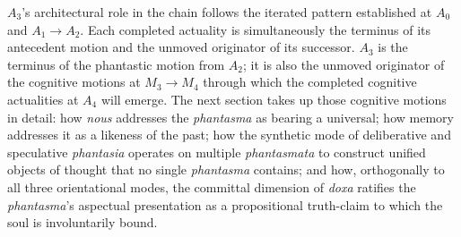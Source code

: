\documentclass[12pt]{article}
\begin{document}
$A_3$'s architectural role in the chain follows the iterated pattern established at $A_0$ and $A_1$$\to$$A_2$. Each completed actuality is simultaneously the terminus of its antecedent motion and the unmoved originator of its successor. $A_3$ is the terminus of the phantastic motion from $A_2$; it is also the unmoved originator of the cognitive motions at $M_3$$\to$$M_4$ through which the completed cognitive actualities at $A_4$ will emerge. The next section takes up those cognitive motions in detail: how \textit{nous} addresses the \textit{phantasma} as bearing a universal; how memory addresses it as a likeness of the past; how the synthetic mode of deliberative and speculative \textit{phantasia} operates on multiple \textit{phantasmata} to construct unified objects of thought that no single \textit{phantasma} contains; and how, orthogonally to all three orientational modes, the committal dimension of \textit{doxa} ratifies the \textit{phantasma}'s aspectual presentation as a propositional truth-claim to which the soul is involuntarily bound.
\end{document}
